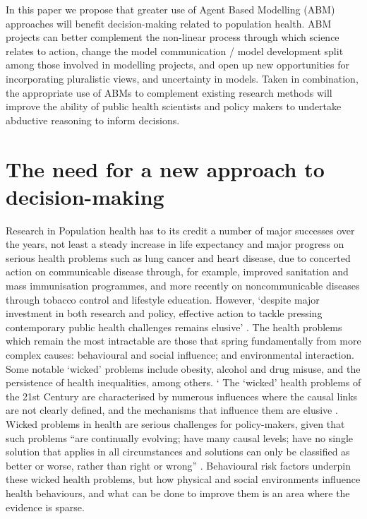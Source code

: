 \documentclass[review]{elsarticle}
\begin{document}
In this paper we propose that greater use of Agent Based Modelling (ABM) approaches will benefit decision-making related to population health. ABM projects can better complement the non-linear process through which science relates to action, change the model communication / model development split among those involved in modelling projects, and open up new opportunities for incorporating pluralistic views, and uncertainty in models. Taken in combination, the appropriate use of ABMs to complement existing research methods will improve the ability of public health scientists and policy makers to undertake abductive reasoning to inform decisions.


\section{The need for a new approach to decision-making}


Research in Population health has to its credit a number of major successes over the years, not least a steady increase in life expectancy and major progress on serious health problems such as lung cancer and heart disease, due to concerted action on communicable disease through, for example, improved sanitation and mass immunisation programmes, and more recently on noncommunicable diseases through tobacco control and lifestyle education.  However, `despite major investment in both research and policy, effective action to tackle pressing contemporary public health challenges remains elusive' \citep{rutter2017}. The health problems which remain the most intractable are those that spring fundamentally from more complex causes: behavioural and social influence; and environmental interaction.  Some notable `wicked' problems include obesity, alcohol and drug misuse, and the persistence of health inequalities, among others.
`
The `wicked' health problems of the 21st Century are characterised by numerous influences where the causal links are not clearly defined, and the mechanisms that influence them are elusive \citep{rittel1973}. Wicked problems in health are serious challenges for policy-makers, given that such problems ``are continually evolving; have many causal levels; have no single solution that applies in all circumstances and solutions can only be classified as better or worse, rather than right or wrong'' \citep{signal2013}.  Behavioural risk factors underpin these wicked health problems, but how physical and social environments influence health behaviours, and what can be done to improve them is an area where the evidence is sparse. 
\end{document}
